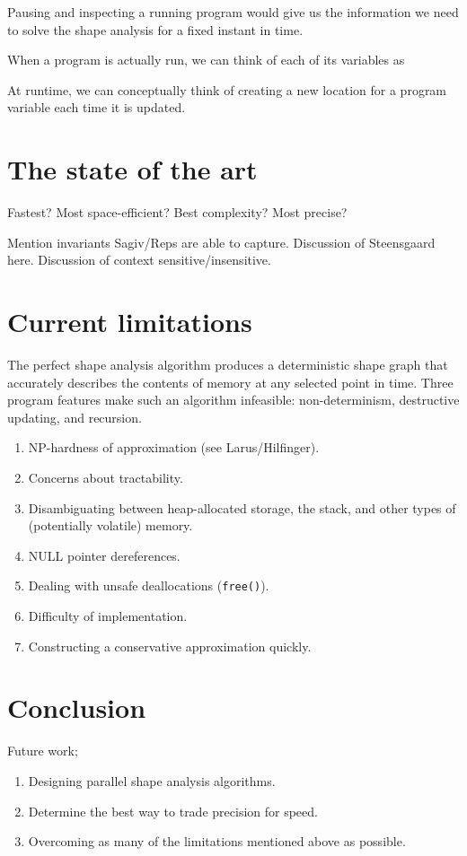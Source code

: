 \documentclass{article}
\begin{document}
Pausing and inspecting a running program would give us the information we
need to solve the shape analysis for a fixed instant in time. 

When a program is actually run, we can think of each of its variables as

At runtime, we can conceptually think of creating a new location for a
program variable each time it is updated. 

\section{The state of the art}

Fastest?
Most space-efficient?
Best complexity?
Most precise?

Mention invariants Sagiv/Reps are able to capture.
Discussion of Steensgaard here.
Discussion of context sensitive/insensitive.

\section{Current limitations}

The perfect shape analysis algorithm produces a deterministic shape graph
that accurately describes the contents of memory at any selected point in
time. Three program features make such an algorithm infeasible:
non-determinism, destructive updating, and recursion. 

\begin{enumerate}[1.]
    \item NP-hardness of approximation (see Larus/Hilfinger).
    \item Concerns about tractability.
    \item Disambiguating between heap-allocated storage, the stack, and
        other types of (potentially volatile) memory.
    \item NULL pointer dereferences.
    \item Dealing with unsafe deallocations (\texttt{free()}).
    \item Difficulty of implementation.
    \item Constructing a conservative approximation quickly.
\end{enumerate}

\section{Conclusion}

Future work;
\begin{enumerate}[1.]
    \item Designing parallel shape analysis algorithms.
    \item Determine the best way to trade precision for speed.
    \item Overcoming as many of the limitations mentioned above as possible.
\end{enumerate}
\end{document}
